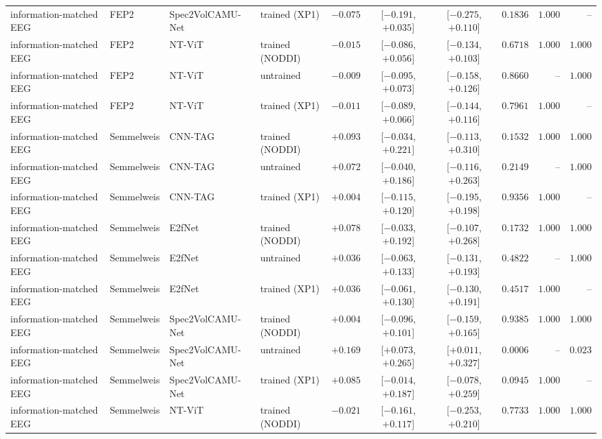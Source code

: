 \documentclass[10pt]{article}
\begin{document}
\begin{longtable}{l l l l r c c r r r}
        information-matched EEG & FEP2 & Spec2VolCAMU-Net & trained (XP1) & $-0.075$ & [$-0.191$, $+0.035$] & [$-0.275$, $+0.110$] & $0.1836$ & $1.000$ & -- \\
        information-matched EEG & FEP2 & NT-ViT & trained (NODDI) & $-0.015$ & [$-0.086$, $+0.056$] & [$-0.134$, $+0.103$] & $0.6718$ & $1.000$ & $1.000$ \\
        information-matched EEG & FEP2 & NT-ViT & untrained & $-0.009$ & [$-0.095$, $+0.073$] & [$-0.158$, $+0.126$] & $0.8660$ & -- & $1.000$ \\
        information-matched EEG & FEP2 & NT-ViT & trained (XP1) & $-0.011$ & [$-0.089$, $+0.066$] & [$-0.144$, $+0.116$] & $0.7961$ & $1.000$ & -- \\
        information-matched EEG & Semmelweis & CNN-TAG & trained (NODDI) & $+0.093$ & [$-0.034$, $+0.221$] & [$-0.113$, $+0.310$] & $0.1532$ & $1.000$ & $1.000$ \\
        information-matched EEG & Semmelweis & CNN-TAG & untrained & $+0.072$ & [$-0.040$, $+0.186$] & [$-0.116$, $+0.263$] & $0.2149$ & -- & $1.000$ \\
        information-matched EEG & Semmelweis & CNN-TAG & trained (XP1) & $+0.004$ & [$-0.115$, $+0.120$] & [$-0.195$, $+0.198$] & $0.9356$ & $1.000$ & -- \\
        information-matched EEG & Semmelweis & E2fNet & trained (NODDI) & $+0.078$ & [$-0.033$, $+0.192$] & [$-0.107$, $+0.268$] & $0.1732$ & $1.000$ & $1.000$ \\
        information-matched EEG & Semmelweis & E2fNet & untrained & $+0.036$ & [$-0.063$, $+0.133$] & [$-0.131$, $+0.193$] & $0.4822$ & -- & $1.000$ \\
        information-matched EEG & Semmelweis & E2fNet & trained (XP1) & $+0.036$ & [$-0.061$, $+0.130$] & [$-0.130$, $+0.191$] & $0.4517$ & $1.000$ & -- \\
        information-matched EEG & Semmelweis & Spec2VolCAMU-Net & trained (NODDI) & $+0.004$ & [$-0.096$, $+0.101$] & [$-0.159$, $+0.165$] & $0.9385$ & $1.000$ & $1.000$ \\
        information-matched EEG & Semmelweis & Spec2VolCAMU-Net & untrained & $+0.169$ & [$+0.073$, $+0.265$] & [$+0.011$, $+0.327$] & $0.0006$ & -- & $0.023$ \\
        information-matched EEG & Semmelweis & Spec2VolCAMU-Net & trained (XP1) & $+0.085$ & [$-0.014$, $+0.187$] & [$-0.078$, $+0.259$] & $0.0945$ & $1.000$ & -- \\
        information-matched EEG & Semmelweis & NT-ViT & trained (NODDI) & $-0.021$ & [$-0.161$, $+0.117$] & [$-0.253$, $+0.210$] & $0.7733$ & $1.000$ & $1.000$ \\

\end{longtable}
\end{document}
